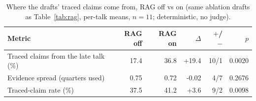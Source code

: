 \begin{table}[t]
\centering
\caption{Where the drafts' traced claims come from, RAG off vs on (same ablation drafts as Table~\ref{tab:rag}, per-talk means, $n=11$; deterministic, no judge).}
\label{tab:provrag}
\footnotesize
\setlength{\tabcolsep}{2.2pt}
\begin{tabular}{lrrrrr}
\toprule
Metric & RAG off & RAG on & $\Delta$ & $+$/$-$ & $p$ \\
\midrule
Traced claims from the late talk (\%) & 17.4 & 36.8 & +19.4 & 10/1 & 0.0020 \\
Evidence spread (quarters used) & 0.75 & 0.72 & -0.02 & 4/7 & 0.2676 \\
Traced-claim rate (\%) & 37.5 & 41.2 & +3.6 & 9/2 & 0.0098 \\
\bottomrule
\end{tabular}
\end{table}
